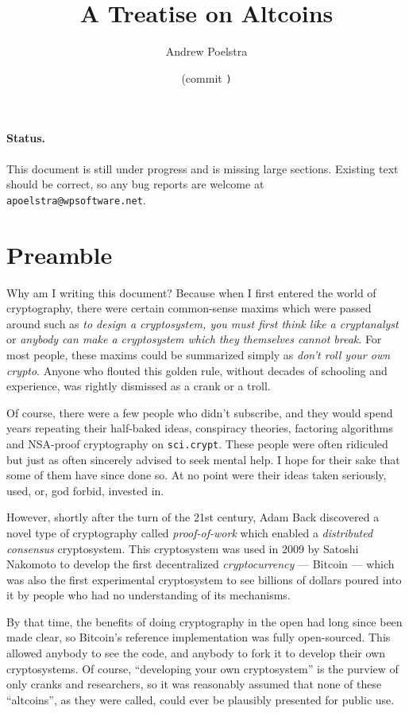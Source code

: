 \documentclass[letterpaper]{article}
\title{A Treatise on Altcoins}
\author{Andrew Poelstra}
\date{\gitAuthorDate{} (commit \texttt{\gitAbbrevHash)}}
\begin{document}
\maketitle

\paragraph{Status.} This document is still under progress and is missing
large sections. Existing text should be correct, so any bug reports are
welcome at \texttt{apoelstra@wpsoftware.net}.

\section{Preamble}

Why am I writing this document? Because when I first entered the
world of cryptography, there were certain common-sense maxims which
were passed around such as \emph{to design a cryptosystem, you must
first think like a cryptanalyst} or \emph{anybody can make a cryptosystem
which they themselves cannot break}. For most people, these maxims
could be summarized simply as \emph{don't roll your own crypto}. Anyone
who flouted this golden rule, without decades of schooling and experience,
was rightly dismissed as a crank or a troll.

Of course, there were a few people who didn't subscribe, and they would
spend years repeating their half-baked ideas, conspiracy theories, factoring
algorithms and NSA-proof cryptography on \texttt{sci.crypt}. These people
were often ridiculed but just as often sincerely advised to seek mental help.
I hope for their sake that some of them have since done so. At no point were
their ideas taken seriously, used, or, god forbid, invested in.

However, shortly after the turn of the 21st century, Adam Back discovered
a novel type of cryptography called \emph{proof-of-work} which enabled a
\emph{distributed consensus}
cryptosystem. This cryptosystem was used in 2009 by Satoshi Nakomoto to
develop the first decentralized \emph{cryptocurrency} --- Bitcoin --- which
was also the first experimental cryptosystem to see billions of dollars
poured into it by people who had no understanding of its mechanisms.

By that time, the benefits of doing cryptography in the open had long
since been made clear, so Bitcoin's reference implementation was fully
open-sourced. This allowed anybody to see the code, and anybody to fork
it to develop their own cryptosystems. Of course, ``developing your own
cryptosystem'' is the purview of only cranks and researchers, so it was
reasonably assumed that none of these ``altcoins'', as they were called,
could ever be plausibly presented for public use.
\end{document}
